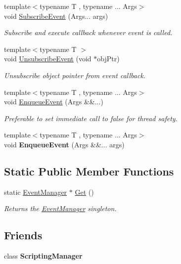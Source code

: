 \begin{DoxyCompactItemize}
{\footnotesize template$<$typename T , typename ... Args$>$ }\\void \hyperlink{classEventManager_a7db87bd554657a6259b31bfd6d099047}{Subscribe\+Event} (Args... args)
\begin{DoxyCompactList}\small\item\em Subscribe and execute callback whenever event is called. \end{DoxyCompactList}\item 
{\footnotesize template$<$typename T $>$ }\\void \hyperlink{classEventManager_afd78cf90f852fe86e147954fc73c02ac}{Unsubscribe\+Event} (void $\ast$obj\+Ptr)
\begin{DoxyCompactList}\small\item\em Unsubscribe object pointer from event callback. \end{DoxyCompactList}\item 
{\footnotesize template$<$typename T , typename ... Args$>$ }\\void \hyperlink{classEventManager_a3b85396571e407ca10908979a9ca958b}{Enqueue\+Event} (Args \&\&...)
\begin{DoxyCompactList}\small\item\em Preferable to set immediate call to false for thread safety. \end{DoxyCompactList}\item 
\mbox{\label{classEventManager_aabb9e663210da65c1393141f62fe9df6}} 
{\footnotesize template$<$typename T , typename ... Args$>$ }\\void {\bfseries Enqueue\+Event} (Args \&\&... args)
\end{DoxyCompactItemize}
\subsection*{Static Public Member Functions}
\begin{DoxyCompactItemize}
\item 
static \hyperlink{classEventManager}{Event\+Manager} $\ast$ \hyperlink{classEventManager_ac8154ede54d2ca9c81c2530f903b20fe}{Get} ()
\begin{DoxyCompactList}\small\item\em Returns the \hyperlink{classEventManager}{Event\+Manager} singleton. \end{DoxyCompactList}\end{DoxyCompactItemize}
\subsection*{Friends}
\begin{DoxyCompactItemize}
\item 
\mbox{\label{classEventManager_ab3d6fafb2064bace492fd6b503d044f4}} 
class {\bfseries Scripting\+Manager}
\end{DoxyCompactItemize}


